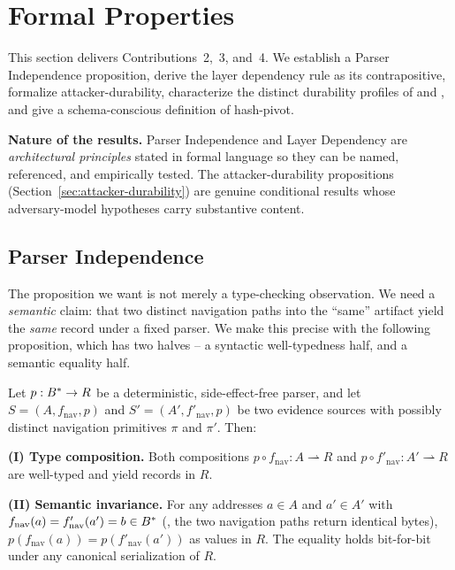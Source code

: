\section{Formal Properties}
\label{sec:properties}

This section delivers Contributions~2,~3, and~4. We establish a Parser
Independence proposition, derive the layer dependency rule as its
contrapositive, formalize attacker-durability, characterize the distinct
durability profiles of  and , and give a schema-conscious
definition of hash-pivot.

\smallskip\noindent\textbf{Nature of the results.}
Parser Independence and Layer Dependency are \emph{architectural principles}
stated in formal language so they can be named, referenced, and empirically
tested. The attacker-durability propositions (Section~\ref{sec:attacker-durability})
are genuine conditional results whose adversary-model hypotheses carry
substantive content.

\subsection{Parser Independence}

The proposition we want is not merely a type-checking observation. We need a
\emph{semantic} claim: that two distinct navigation paths into the
``same'' artifact yield the \emph{same} record under a fixed parser. We
make this precise with the following proposition, which has two halves -- a
syntactic well-typedness half, and a semantic equality half.

\begin{proposition}
\label{thm:parser-indep}
Let $p : B^{*} \to R$ be a deterministic, side-effect-free parser, and let
$S = (A, f_{\mathrm{nav}}, p)$ and $S' = (A', f'_{\mathrm{nav}}, p)$ be two
evidence sources with possibly distinct navigation primitives $\pi$ and
$\pi'$. Then:

\smallskip
\noindent\textbf{(I) Type composition.}
Both compositions $p \circ f_{\mathrm{nav}}: A \rightharpoonup R$ and $p
\circ f'_{\mathrm{nav}}: A' \rightharpoonup R$ are well-typed and yield
records in $R$.

\smallskip
\noindent\textbf{(II) Semantic invariance.}
For any addresses $a \in A$ and $a' \in A'$ with $f_{\mathrm{nav}}(a) =
f'_{\mathrm{nav}}(a') = b \in B^{*}$ (\ie{}, the two navigation paths
return identical bytes), $p(f_{\mathrm{nav}}(a)) = p(f'_{\mathrm{nav}}(a'))$
as values in $R$. The equality holds bit-for-bit under any canonical
serialization of $R$.
\end{proposition}

